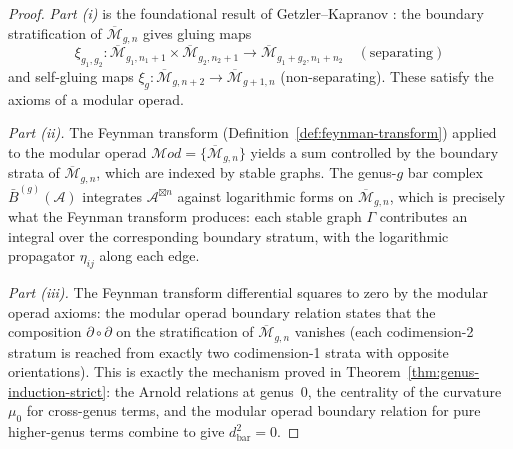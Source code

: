 \begin{proof}
\emph{Part (i)} is the foundational result of
Getzler--Kapranov \cite[§5]{GeK98}: the boundary stratification of
$\overline{\mathcal{M}}_{g,n}$ gives gluing maps
\[
\xi_{g_1,g_2}\colon \overline{\mathcal{M}}_{g_1,n_1+1} \times
\overline{\mathcal{M}}_{g_2,n_2+1} \to
\overline{\mathcal{M}}_{g_1+g_2,n_1+n_2}
\quad (\text{separating})
\]
and self-gluing maps
$\xi_g\colon \overline{\mathcal{M}}_{g,n+2} \to
\overline{\mathcal{M}}_{g+1,n}$
(non-separating).  These satisfy the axioms of a modular operad.

\emph{Part (ii).}
The Feynman transform (Definition~\ref{def:feynman-transform})
applied to the modular operad
$\mathcal{M}od = \{\overline{\mathcal{M}}_{g,n}\}$ yields a sum
controlled by the
boundary strata of $\overline{\mathcal{M}}_{g,n}$, which are
indexed by stable graphs.  The genus-$g$ bar complex
$\bar{B}^{(g)}(\mathcal{A})$ integrates
$\mathcal{A}^{\boxtimes n}$ against logarithmic forms on
$\overline{\mathcal{M}}_{g,n}$, which is precisely what
the Feynman transform produces: each stable graph $\Gamma$
contributes an integral over the corresponding boundary stratum,
with the logarithmic propagator $\eta_{ij}$ along each edge.

\emph{Part (iii).}
The Feynman transform differential squares to zero by the
modular operad axioms: the modular operad boundary relation states
that the composition $\partial \circ \partial$ on the
stratification of $\overline{\mathcal{M}}_{g,n}$ vanishes (each
codimension-2 stratum is reached from exactly two codimension-1
strata with opposite orientations).  This is exactly the mechanism
proved in Theorem~\ref{thm:genus-induction-strict}: the Arnold
relations at genus~$0$, the centrality of the curvature $\mu_0$
for cross-genus terms, and the modular operad boundary relation
for pure higher-genus terms combine to give
$d_{\mathrm{bar}}^2 = 0$.
\end{proof}

